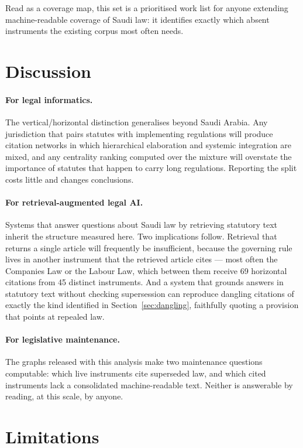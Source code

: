 \documentclass[sn-basic]{sn-jnl}%
\begin{document}
Read as a coverage map, this set is a prioritised work list for anyone
extending machine-readable coverage of Saudi law: it identifies exactly
which absent instruments the existing corpus most often needs.

\section{Discussion}
\label{sec:discussion}

\paragraph{For legal informatics.}
The vertical/horizontal distinction generalises beyond Saudi Arabia. Any
jurisdiction that pairs statutes with implementing regulations will produce
citation networks in which hierarchical elaboration and systemic integration
are mixed, and any centrality ranking computed over the mixture will
overstate the importance of statutes that happen to carry long regulations.
Reporting the split costs little and changes conclusions.

\paragraph{For retrieval-augmented legal AI.}
Systems that answer questions about Saudi law by retrieving statutory text
inherit the structure measured here. Two implications follow. Retrieval that
returns a single article will frequently be insufficient, because the
governing rule lives in another instrument that the retrieved article cites
--- most often the Companies Law or the Labour Law, which between them
receive 69 horizontal citations from 45 distinct instruments. And a system that grounds answers in
statutory text without checking supersession can reproduce dangling
citations of exactly the kind identified in Section~\ref{sec:dangling},
faithfully quoting a provision that points at repealed law.

\paragraph{For legislative maintenance.}
The graphs released with this analysis make two maintenance questions
computable: which live instruments cite superseded law, and which cited
instruments lack a consolidated machine-readable text. Neither is answerable
by reading, at this scale, by anyone.

\section{Limitations}
\label{sec:limitations}
\end{document}
